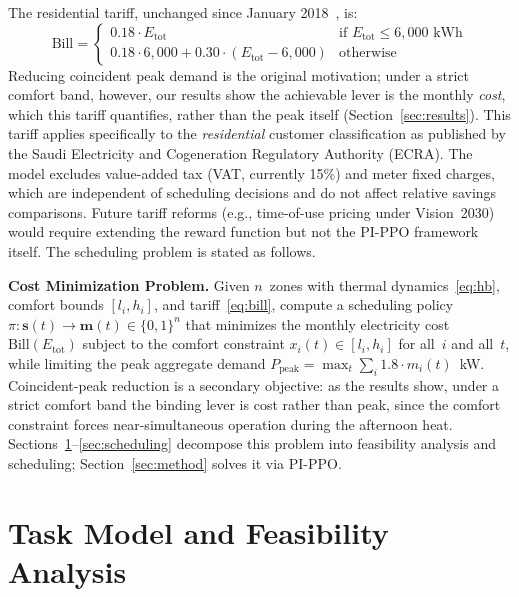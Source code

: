 \documentclass[12pt,a4paper]{article}
\begin{document}
The residential tariff, unchanged since January 2018~\cite{ref14}, is:
\begin{equation}
\text{Bill} = \begin{cases}
0.18 \cdot E_{\text{tot}} & \text{if } E_{\text{tot}} \leq 6{,}000 \text{ kWh} \\
0.18 \cdot 6{,}000 + 0.30 \cdot (E_{\text{tot}} - 6{,}000) & \text{otherwise}
\end{cases}
\label{eq:bill}
\end{equation}
Reducing coincident peak demand is the original motivation; under a strict comfort band, however, our results show the achievable lever is the monthly \emph{cost}, which this tariff quantifies, rather than the peak itself (Section~\ref{sec:results}). This tariff applies specifically to the \textit{residential} customer classification as published by the Saudi Electricity and Cogeneration Regulatory Authority (ECRA). The model excludes value-added tax (VAT, currently 15\%) and meter fixed charges, which are independent of scheduling decisions and do not affect relative savings comparisons. Future tariff reforms (e.g., time-of-use pricing under Vision~2030) would require extending the reward function but not the PI-PPO framework itself. The scheduling problem is stated as follows.

\textbf{Cost Minimization Problem.} Given $n$~zones with thermal dynamics~\eqref{eq:hb}, comfort bounds $[l_i, h_i]$, and tariff~\eqref{eq:bill}, compute a scheduling policy $\pi: \mathbf{s}(t) \to \mathbf{m}(t) \in \{0,1\}^n$ that minimizes the monthly electricity cost $\text{Bill}(E_{\text{tot}})$ subject to the comfort constraint $x_i(t) \in [l_i, h_i]$ for all~$i$ and all~$t$, while limiting the peak aggregate demand $P_{\text{peak}} = \max_t \sum_i 1.8 \cdot m_i(t)$~kW. Coincident-peak reduction is a secondary objective: as the results show, under a strict comfort band the binding lever is cost rather than peak, since the comfort constraint forces near-simultaneous operation during the afternoon heat. Sections~\ref{sec:task}--\ref{sec:scheduling} decompose this problem into feasibility analysis and scheduling; Section~\ref{sec:method} solves it via PI-PPO.

\section{Task Model and Feasibility Analysis}
\label{sec:task}
\end{document}
